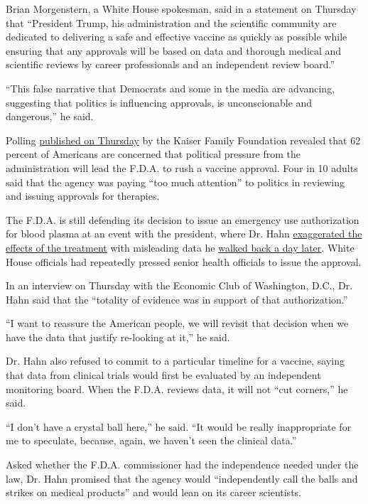 Brian Morgenstern, a White House spokesman, said in a statement on
Thursday that ``President Trump, his administration and the scientific
community are dedicated to delivering a safe and effective vaccine as
quickly as possible while ensuring that any approvals will be based on
data and thorough medical and scientific reviews by career professionals
and an independent review board.''

``This false narrative that Democrats and some in the media are
advancing, suggesting that politics is influencing approvals, is
unconscionable and dangerous,'' he said.

Polling
\href{https://www.kff.org/coronavirus-covid-19/report/kff-health-tracking-poll-september-2020/}{published
on Thursday} by the Kaiser Family Foundation revealed that 62 percent of
Americans are concerned that political pressure from the administration
will lead the F.D.A. to rush a vaccine approval. Four in 10 adults said
that the agency was paying ``too much attention'' to politics in
reviewing and issuing approvals for therapies.

The F.D.A. is still defending its decision to issue an emergency use
authorization for blood plasma at an event with the president, where Dr.
Hahn
\href{https://www.nytimes3xbfgragh.onion/2020/08/24/health/fda-blood-plasma.html}{exaggerated
the effects of the treatment} with misleading data he
\href{https://twitter.com/SteveFDA/status/1298071619236245504?}{walked
back a day later}. White House officials had repeatedly pressed senior
health officials to issue the approval.

In an interview on Thursday with the Economic Club of Washington, D.C.,
Dr. Hahn said that the ``totality of evidence was in support of that
authorization.''

``I want to reassure the American people, we will revisit that decision
when we have the data that justify re-looking at it,'' he said.

Dr. Hahn also refused to commit to a particular timeline for a vaccine,
saying that data from clinical trials would first be evaluated by an
independent monitoring board. When the F.D.A. reviews data, it will not
``cut corners,'' he said.

``I don't have a crystal ball here,'' he said. ``It would be really
inappropriate for me to speculate, because, again, we haven't seen the
clinical data.''

Asked whether the F.D.A. commissioner had the independence needed under
the law, Dr. Hahn promised that the agency would ``independently call
the balls and strikes on medical products'' and would lean on its career
scientists.

